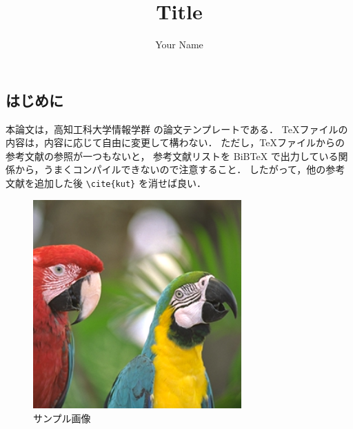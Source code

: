 \documentclass[a4j]{jarticle}
\title{Title}
\author{Your Name}
\begin{document}
\begin{Abstract}

  \section{はじめに}

  本論文は，高知工科大学情報学群 \cite{kut} の論文テンプレートである．
  \TeX ファイルの内容は，内容に応じて自由に変更して構わない．
  ただし，\TeX ファイルからの参考文献の参照が一つもないと，
  参考文献リストを BiBTeX で出力している関係から，うまくコンパイルできないので注意すること．
  したがって，他の参考文献を追加した後 \verb|\cite{kut}| を消せば良い．

  \begin{figure}[ht]
    \centering
    \includegraphics[width=8cm]{images/Parrots.png}
    \caption{サンプル画像}
    \label{fig:sample}
  \end{figure}

  
  


\end{Abstract}
\end{document}
